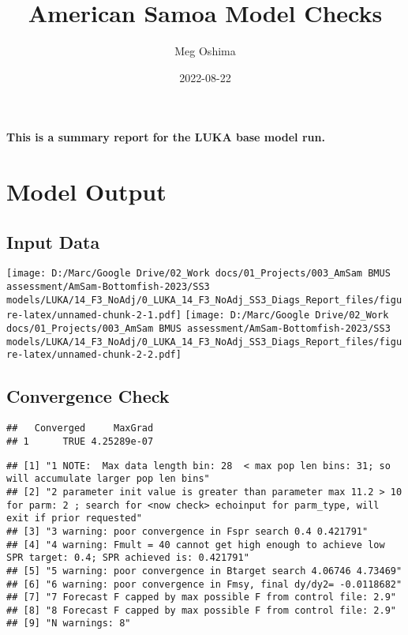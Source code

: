 \documentclass[
]{article}
\title{American Samoa Model Checks}
\author{Meg Oshima}
\date{2022-08-22}
\begin{document}
\maketitle

\textbf{This is a summary report for the LUKA base model run.}

\hypertarget{model-output}{%
\section{Model Output}\label{model-output}}

\hypertarget{input-data}{%
\subsection{Input Data}\label{input-data}}

\texttt{[image: D:/Marc/Google Drive/02\_Work docs/01\_Projects/003\_AmSam BMUS assessment/AmSam-Bottomfish-2023/SS3 models/LUKA/14\_F3\_NoAdj/0\_LUKA\_14\_F3\_NoAdj\_SS3\_Diags\_Report\_files/figure-latex/unnamed-chunk-2-1.pdf]}
\texttt{[image: D:/Marc/Google Drive/02\_Work docs/01\_Projects/003\_AmSam BMUS assessment/AmSam-Bottomfish-2023/SS3 models/LUKA/14\_F3\_NoAdj/0\_LUKA\_14\_F3\_NoAdj\_SS3\_Diags\_Report\_files/figure-latex/unnamed-chunk-2-2.pdf]}

\hypertarget{convergence-check}{%
\subsection{Convergence Check}\label{convergence-check}}

\begin{verbatim}
##   Converged     MaxGrad
## 1      TRUE 4.25289e-07
\end{verbatim}

\begin{verbatim}
## [1] "1 NOTE:  Max data length bin: 28  < max pop len bins: 31; so will accumulate larger pop len bins"                                                         
## [2] "2 parameter init value is greater than parameter max 11.2 > 10 for parm: 2 ; search for <now check> echoinput for parm_type, will exit if prior requested"
## [3] "3 warning: poor convergence in Fspr search 0.4 0.421791"                                                                                                  
## [4] "4 warning: Fmult = 40 cannot get high enough to achieve low SPR target: 0.4; SPR achieved is: 0.421791"                                                   
## [5] "5 warning: poor convergence in Btarget search 4.06746 4.73469"                                                                                            
## [6] "6 warning: poor convergence in Fmsy, final dy/dy2= -0.0118682"                                                                                            
## [7] "7 Forecast F capped by max possible F from control file: 2.9"                                                                                             
## [8] "8 Forecast F capped by max possible F from control file: 2.9"                                                                                             
## [9] "N warnings: 8"
\end{verbatim}
\end{document}
